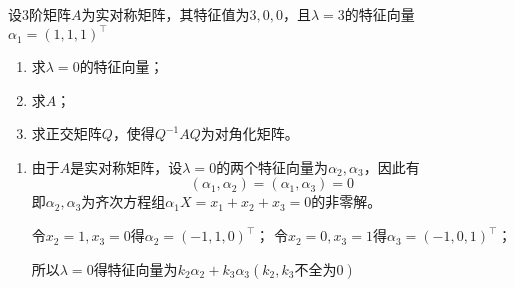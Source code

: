 \begin{example}
    设$3$阶矩阵$A$为实对称矩阵，其特征值为$3,0,0$，且$\lambda=3$的特征向量$\alpha_1 = (1,1,1)^\intercal$
    \begin{enumerate}[(1)]
        \item 求$\lambda=0$的特征向量；
        \item 求$A$；
        \item 求正交矩阵$Q$，使得$Q^{-1}AQ$为对角化矩阵。
    \end{enumerate}
\end{example}
\begin{solution}
    \begin{enumerate}[(1)]
        \item 由于$A$是实对称矩阵，设$\lambda=0$的两个特征向量为$\alpha_2,\alpha_3$，因此有
              \[ (\alpha_1,\alpha_2) = (\alpha_1,\alpha_3) = 0 \]
              即$\alpha_2,\alpha_3$为齐次方程组$\alpha_1X=x_1+x_2+x_3=0$的非零解。

              令$x_2=1,x_3=0$得$\alpha_2 =(-1,1,0)^\intercal$；
              令$x_2=0,x_3=1$得$\alpha_3=(-1,0,1)^\intercal$；

              所以$\lambda=0$得特征向量为$k_2\alpha_2+k_3\alpha_3 (k_2,k_3\text{不全为}0)$


\end{enumerate}
\end{solution}
